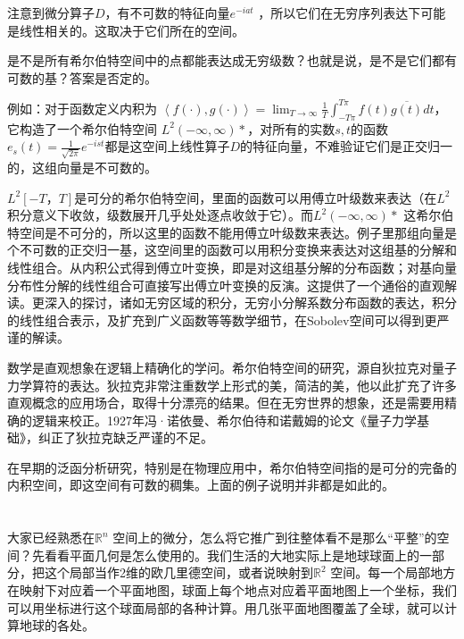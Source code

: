 注意到微分算子$ D $，有不可数的特征向量$ e^{−iat} $ ，所以它们在无穷序列表达下可能是线性相关的。这取决于它们所在的空间。

是不是所有希尔伯特空间中的点都能表达成无穷级数？也就是说，是不是它们都有可数的基？答案是否定的。

\kaishu\setlength{\leftskip}{1em}

例如：对于函数定义内积为 $ \left \langle f(\cdot),g(\cdot) \right \rangle = \lim_{T\rightarrow \infty}\frac{1}{T}\int_{-T\pi}^{T\pi} f(t)\overline{g(t)}dt $，它构造了一个希尔伯特空间 $ L^2(-\infty, \infty)* $，对所有的实数$ s, t $的函数 $ e_s(t) = \frac{1}{\sqrt{2\pi}}e^{-ist} $都是这空间上线性算子$ D $的特征向量，不难验证它们是正交归一的，这组向量是不可数的。

\songti\setlength{\leftskip}{0em}

$ L^2[-T，T] $是可分的希尔伯特空间，里面的函数可以用傅立叶级数来表达（在$ L^2 $积分意义下收敛，级数展开几乎处处逐点收敛于它）。而$ L^2(-\infty, \infty)* $ 这希尔伯特空间是不可分的，所以这里的函数不能用傅立叶级数来表达。例子里那组向量是个不可数的正交归一基，这空间里的函数可以用积分变换来表达对这组基的分解和线性组合。从内积公式得到傅立叶变换，即是对这组基分解的分布函数；对基向量分布性分解的线性组合可直接写出傅立叶变换的反演。这提供了一个通俗的直观解读。更深入的探讨，诸如无穷区域的积分，无穷小分解系数分布函数的表达，积分的线性组合表示，及扩充到广义函数等等数学细节，在Sobolev空间可以得到更严谨的解读。

数学是直观想象在逻辑上精确化的学问。希尔伯特空间的研究，源自狄拉克对量子力学算符的表达。狄拉克非常注重数学上形式的美，简洁的美，他以此扩充了许多直观概念的应用场合，取得十分漂亮的结果。但在无穷世界的想象，还是需要用精确的逻辑来校正。1927年冯·诺依曼、希尔伯待和诺戴姆的论文《量子力学基础》，纠正了狄拉克缺乏严谨的不足。

在早期的泛函分析研究，特别是在物理应用中，希尔伯特空间指的是可分的完备的内积空间，即这空间有可数的稠集。上面的例子说明并非都是如此的。\\
\\
\\

大家已经熟悉在$ \mathbb{R}^n $ 空间上的微分，怎么将它推广到往整体看不是那么“平整”的空间？先看看平面几何是怎么使用的。我们生活的大地实际上是地球球面上的一部分，把这个局部当作2维的欧几里德空间，或者说映射到$ \mathbb{R}^2 $ 空间。每一个局部地方在映射下对应着一个平面地图，球面上每个地点对应着平面地图上一个坐标，我们可以用坐标进行这个球面局部的各种计算。用几张平面地图覆盖了全球，就可以计算地球的各处。


